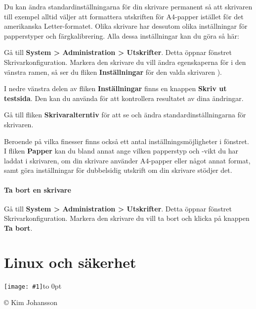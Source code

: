 \documentclass[a4paper,final]{memoir} %
\newcommand{\xrcredit}[1]{\hbox to 0pt{\hspace*{.6\baselineskip}\begin{rotate}{90}{\usefont{T1}{phv}{m}{n}\selectfont\tiny #1}\end{rotate}}}
\newcommand\xintropic[1]{{\texttt{[image: \#1]}\xrcredit{\copyright{} Kim Johansson}}\medskip}
\newcommand\xchapter[2]{\chapter{#2}\begin{center}\xintropic{#1}\end{center}}
\begin{document}
Du kan ändra standardinställningarna för din skrivare permanent så att skrivaren till exempel alltid väljer att formattera utskriften för A4-papper istället för det amerikanska Letter-formatet. Olika skrivare har dessutom olika inställningar för papperstyper och färgkalibrering. Alla dessa inställningar kan du göra så här:

Gå till \textbf{System \textgreater{} Administration \textgreater{} Utskrifter}. Detta öppnar fönstret Skrivarkonfiguration. Markera den skrivare du vill ändra egenskaperna för i den vänstra ramen, så ser du fliken \textbf{Inställningar} för den valda skrivaren ). 

I nedre vänstra delen av fliken \textbf{Inställningar} finns en knappen \textbf{Skriv ut testsida}. Den kan du använda för att kontrollera resultatet av dina ändringar.


Gå till fliken \textbf{Skrivaralterntiv} för att se och ändra standardinställningarna för skrivaren.

Beroende på vilka finesser finns också ett antal inställningsmöjligheter i fönstret. I fliken \textbf{Papper} kan du bland annat ange vilken papperstyp och -vikt du har laddat i skrivaren, om din skrivare använder A4-papper eller något annat format, samt göra inställningar för dubbelsidig utskrift om din skrivare stödjer det. %


\subsubsection{Ta bort en skrivare}

Gå till \textbf{System \textgreater{} Administration \textgreater{} Utskrifter}. Detta öppnar fönstret Skrivarkonfiguration. Markera den skrivare du vill ta bort och klicka på knappen \textbf{Ta bort}. 


\xchapter{bilder804-all/Linux_och_Sakerhet}{Linux och säkerhet}


\end{document}

